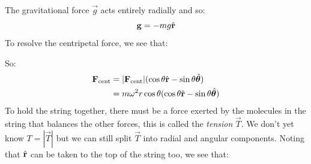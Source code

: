 \documentclass[../main.tex]{subfiles}
\begin{document}
\begin{example}
  The gravitational force $\vec{g}$ acts entirely radially and so:
  \[
    \mathbf{\bm{g}} = - m g \hat{\mathbf{\bm{r}}}
  \]
  To resolve the centripetal force, we see that:
  \begin{center}
  \end{center}
  So:
  \begin{align*}
    \mathbf{\bm{F}}_{\text{cent}} &= |\mathbf{\bm{F}}_{\text{cent}}| (\cos \theta \hat{\mathbf{\bm{r}}} - \sin \theta \hat{\mathbf{\bm{\theta}}}) \\
                          &= m \omega^2 r \cos \theta (\cos \theta \hat{\mathbf{\bm{r}}} - \sin \theta \hat{\mathbf{\bm{\theta}}})
  \end{align*}
  To hold the string together, there must be a force exerted by the molecules in the string that balances the other forces, this is called the \textit{tension} $\vec{T}$.
  We don't yet know $T = |\vec{T}|$ but we can still split $\vec{T}$ into radial and angular components.
  Noting that $\hat{\mathbf{\bm{r}}}$ can be taken to the top of the string too, we see that:
  \begin{center}
\end{center}
\end{example}
\end{document}
